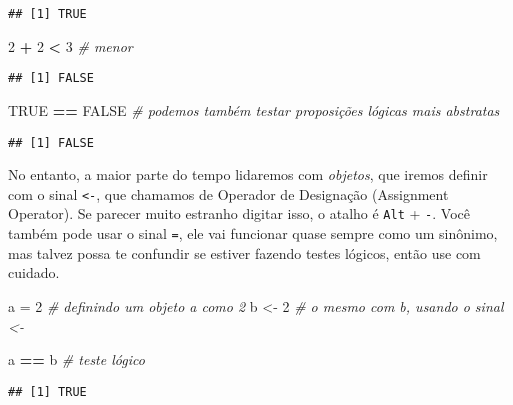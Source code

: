 \documentclass[]{article}
\newenvironment{Shaded}{\begin{snugshade}}{\end{snugshade}}
\newcommand{\CommentTok}[1]{\textcolor[rgb]{0.56,0.35,0.01}{\textit{#1}}}
\newcommand{\DecValTok}[1]{\textcolor[rgb]{0.00,0.00,0.81}{#1}}
\newcommand{\NormalTok}[1]{#1}
\newcommand{\OperatorTok}[1]{\textcolor[rgb]{0.81,0.36,0.00}{\textbf{#1}}}
\newcommand{\OtherTok}[1]{\textcolor[rgb]{0.56,0.35,0.01}{#1}}
\newcommand{\StringTok}[1]{\textcolor[rgb]{0.31,0.60,0.02}{#1}}
\begin{document}
\begin{verbatim}
## [1] TRUE
\end{verbatim}

\begin{Shaded}
\begin{Highlighting}[]
\DecValTok{2} \OperatorTok{+}\StringTok{ }\DecValTok{2} \OperatorTok{<}\StringTok{ }\DecValTok{3} \CommentTok{# menor}
\end{Highlighting}
\end{Shaded}

\begin{verbatim}
## [1] FALSE
\end{verbatim}

\begin{Shaded}
\begin{Highlighting}[]
\OtherTok{TRUE} \OperatorTok{==}\StringTok{ }\OtherTok{FALSE} \CommentTok{# podemos também testar proposições lógicas mais abstratas}
\end{Highlighting}
\end{Shaded}

\begin{verbatim}
## [1] FALSE
\end{verbatim}

No entanto, a maior parte do tempo lidaremos com \emph{objetos}, que
iremos definir com o sinal \texttt{\textless{}-}, que chamamos de
Operador de Designação (Assignment Operator). Se parecer muito estranho
digitar isso, o atalho é \texttt{Alt} + \texttt{-}. Você também pode
usar o sinal \texttt{=}, ele vai funcionar quase sempre como um
sinônimo, mas talvez possa te confundir se estiver fazendo testes
lógicos, então use com cuidado.

\begin{Shaded}
\begin{Highlighting}[]
\NormalTok{a =}\StringTok{ }\DecValTok{2} \CommentTok{# definindo um objeto a como 2}
\NormalTok{b <-}\StringTok{ }\DecValTok{2} \CommentTok{# o mesmo com b, usando o sinal <-}

\NormalTok{a }\OperatorTok{==}\StringTok{ }\NormalTok{b }\CommentTok{# teste lógico}
\end{Highlighting}
\end{Shaded}

\begin{verbatim}
## [1] TRUE
\end{verbatim}
\end{document}
